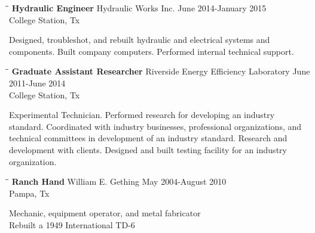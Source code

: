 \documentclass{res}
\begin{document}
\begin{resume}
  \begin{tabbing}
   \hspace{2.5in}\= \hspace{2.6in}\= \kill %
    {\bf Hydraulic Engineer} \>Hydraulic Works Inc.     \>June 2014-January 2015\\
    \>College Station, Tx
   \end{tabbing}\vspace{-20pt}      %
   Designed, troubleshot, and rebuilt hydraulic and electrical systems and components. Built company computers. Performed internal technical support.

   \begin{tabbing}
   \hspace{2.5in}\= \hspace{2.6in}\= \kill %
    {\bf Graduate Assistant Researcher} \>Riverside Energy Efficiency Laboratory     \>June 2011-June 2014\\
    	\>College Station, Tx
   \end{tabbing}\vspace{-20pt}      %
   	Experimental Technician. Performed research for developing an industry standard. Coordinated with industry businesses, professional organizations, and technical committees in development of an industry standard. Research and development with clients. Designed and built testing facility for an industry organization.
   \begin{tabbing}
   \hspace{2.5in}\= \hspace{2.6in}\= \kill %
    {\bf Ranch Hand} \>William E. Gething \> May 2004-August 2010 \\
                          \>Pampa, Tx
   \end{tabbing}\vspace{-20pt}
   Mechanic, equipment operator, and metal fabricator\\
   Rebuilt a 1949 International TD-6


\end{resume}
\end{document}

